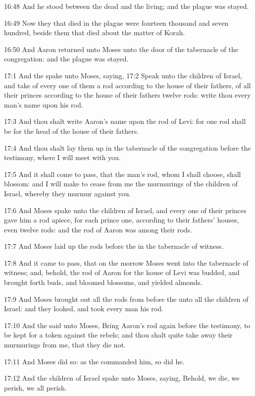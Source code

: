 16:48 And he stood between the dead and the living; and the plague was
stayed.

16:49 Now they that died in the plague were fourteen thousand and
seven hundred, beside them that died about the matter of Korah.

16:50 And Aaron returned unto Moses unto the door of the tabernacle of
the congregation: and the plague was stayed.

17:1 And the \LORD spake unto Moses, saying, 17:2 Speak unto the
children of Israel, and take of every one of them a rod according to
the house of their fathers, of all their princes according to the
house of their fathers twelve rods: write thou every man's name upon
his rod.

17:3 And thou shalt write Aaron's name upon the rod of Levi: for one
rod shall be for the head of the house of their fathers.

17:4 And thou shalt lay them up in the tabernacle of the congregation
before the testimony, where I will meet with you.

17:5 And it shall come to pass, that the man's rod, whom I shall
choose, shall blossom: and I will make to cease from me the murmurings
of the children of Israel, whereby they murmur against you.

17:6 And Moses spake unto the children of Israel, and every one of
their princes gave him a rod apiece, for each prince one, according to
their fathers' houses, even twelve rods: and the rod of Aaron was
among their rods.

17:7 And Moses laid up the rods before the \LORD in the tabernacle of
witness.

17:8 And it came to pass, that on the morrow Moses went into the
tabernacle of witness; and, behold, the rod of Aaron for the house of
Levi was budded, and brought forth buds, and bloomed blossoms, and
yielded almonds.

17:9 And Moses brought out all the rods from before the \LORD unto all
the children of Israel: and they looked, and took every man his rod.

17:10 And the \LORD said unto Moses, Bring Aaron's rod again before the
testimony, to be kept for a token against the rebels; and thou shalt
quite take away their murmurings from me, that they die not.

17:11 And Moses did so: as the \LORD commanded him, so did he.

17:12 And the children of Israel spake unto Moses, saying, Behold, we
die, we perish, we all perish.

